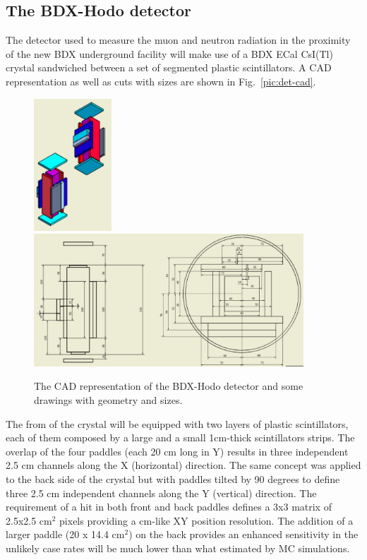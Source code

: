 \subsection{The BDX-Hodo detector}
The detector used to measure the muon and neutron radiation in the proximity of the new BDX underground facility will  make use of a BDX ECal CsI(Tl) crystal sandwiched between a set of segmented plastic scintillators.
A CAD representation as well as   cuts with sizes are shown in Fig.~\ref{pic:det-cad}.
\begin{figure}[h!] 
\center
\includegraphics[width=2.9cm]{figs/det-3d1.pdf}  
\includegraphics[width=10.1cm]{figs/det-3d2.pdf}  
\caption{The CAD representation of the BDX-Hodo detector and some drawings with geometry and sizes.}
\label{fig:det-cad}
\end{figure}
The from of the crystal will be equipped with two  layers of plastic scintillators, each of them composed by  a large and a small 1cm-thick scintillators strips. The overlap of the four paddles (each 20 cm long in Y)  results in three independent  2.5 cm channels along the X (horizontal) direction.
The same concept was applied to the  back side of the crystal but with paddles tilted by 90 degrees to define three 2.5 cm independent channels along the Y (vertical) direction. The requirement of a hit in both front and back paddles defines a 3x3 matrix of 2.5x2.5 cm$^2$ pixels providing a cm-like XY position resolution. 
The addition of a larger paddle (20 x 14.4 cm$^2$) on the back provides an enhanced sensitivity   in the unlikely  case rates will be much lower than what estimated by MC simulations.
